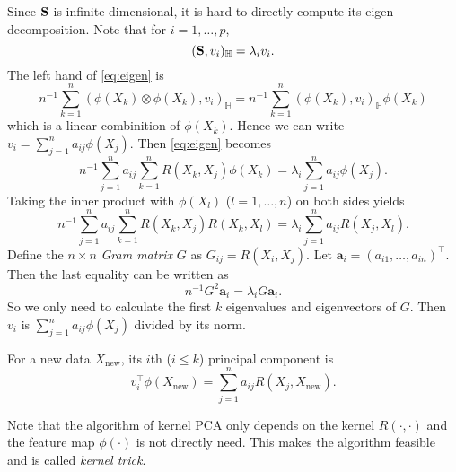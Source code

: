 \documentclass[11pt]{article}
\newcommand{\Ba}{\mathbf{a}}    \newcommand{\Bb}{\mathbf{b}}    \newcommand{\Bc}{\mathbf{c}}    \newcommand{\Bd}{\mathbf{d}}    \newcommand{\Be}{\mathbf{e}}    \newcommand{\Bf}{\mathbf{f}}    \newcommand{\Bg}{\mathbf{g}}    \newcommand{\Bh}{\mathbf{h}}    \newcommand{\Bi}{\mathbf{i}}    \newcommand{\Bj}{\mathbf{j}}    \newcommand{\Bk}{\mathbf{k}}    \newcommand{\Bl}{\mathbf{l}}
\theoremstyle{plain}
\theoremstyle{definition}
\theoremstyle{remark}
\begin{document}
Since $\mathbf{S}$ is infinite dimensional, it is hard to directly compute its eigen decomposition.
Note that for $i=1,\ldots, p$,
\begin{equation}\label{eq:eigen}
    (\mathbf{S}, v_i)_{\mathbb H}=\lambda_i v_i.
\end{equation}
The left hand of \eqref{eq:eigen} is
\begin{equation*}
n^{-1}\sum_{k=1}^n
(
     \phi(X_k) \otimes \phi(X_k)
    , v_i)_{\mathbb H}
    =
n^{-1}\sum_{k=1}^n
     (\phi(X_k)
    , v_i)_{\mathbb H}\phi(X_k) 
\end{equation*}
which is a linear combinition of $\phi(X_k)$.
Hence we can write $v_i=\sum_{j=1}^n a_{ij}\phi(X_j)$.
Then \eqref{eq:eigen} becomes
\begin{equation*}
n^{-1}
\sum_{j=1}^n a_{ij}
\sum_{k=1}^n
R(X_{k},X_{j})\phi(X_k) 
=\lambda_i \sum_{j=1}^n  a_{ij}\phi(X_j).
\end{equation*}
Taking the inner product with $\phi(X_l)$ ($l=1,\ldots , n$) on both sides yields
\begin{equation*}
n^{-1}
\sum_{j=1}^n a_{ij}
\sum_{k=1}^n
     R(X_k
    ,
X_j
)
R(X_k , X_l)
= \lambda_i \sum_{j=1}^n  a_{ij} R(X_j, X_l).
\end{equation*}
Define the $n\times n$ \emph{Gram matrix} $G$ as $G_{ij}= R(X_i,X_j)$.
Let $\Ba_i =(a_{i1},\ldots, a_{i n})^\top$.
Then the last equality can be written as
\begin{equation*}
    n^{-1} G^2 \Ba_i= \lambda_i G \Ba_i.
\end{equation*}
So we only need to calculate the first $k$ eigenvalues and eigenvectors of $G$.
Then $v_i$ is $\sum_{j=1}^n a_{ij}\phi(X_j)$ divided by its norm.

For a new data $X_{\text{new}}$, its $i$th ($i\leq k$) principal component is
\begin{equation*}
    v_i^\top \phi(X_{\text{new}})
    =\sum_{j=1}^n a_{ij} R(X_j, X_{\text{new}}).
\end{equation*}

Note that the algorithm of kernel PCA only depends on the kernel $R(\cdot,\cdot)$ and the feature map $\phi(\cdot)$ is not directly need. 
This makes the algorithm feasible and is called \emph{kernel trick}.

\end{document}

